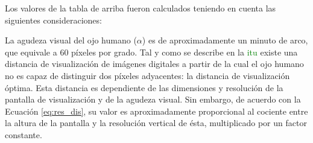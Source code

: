 \documentclass[a4paper, 12pt]{report}
\begin{document}
\begin{table}[H]
\centering
{}
\caption{Relación entre la resolución y la distancia de visualización}
\label{table:res_dis}
\end{table}
Los valores de la tabla de arriba fueron calculados teniendo en cuenta las siguientes consideraciones:

La agudeza visual del ojo humano ($\alpha$) es de aproximadamente  un minuto de arco, que equivale a 60 píxeles por grado. Tal y como se describe en la \textcolor{green}{itu} existe una distancia de visualización de imágenes digitales a partir de la cual el ojo humano no es capaz de distinguir dos píxeles adyacentes: la distancia de visualización óptima. Esta distancia es dependiente de las dimensiones y resolución de la pantalla de visualización y de la agudeza visual. Sin embargo, de acuerdo con la Ecuación \ref{eq:res_dis}, su valor es aproximadamente proporcional al cociente entre la altura de la pantalla y la resolución vertical de ésta, multiplicado por un factor constante.
\end{document}
